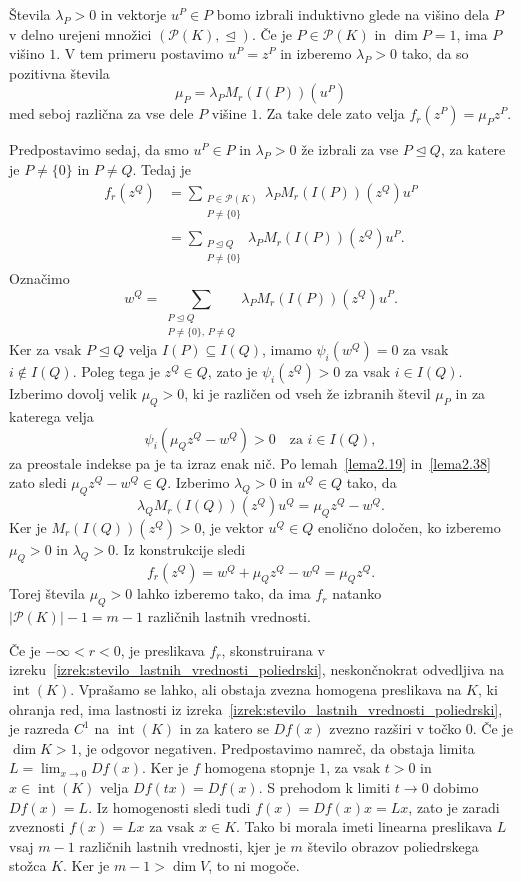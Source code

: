 \documentclass[mat2, tisk]{fmfdelo}
\begin{document}
\begin{dokaz}
Števila $\lambda_P>0$ in vektorje $u^P\in P$ bomo izbrali induktivno
glede na višino dela $P$ v delno urejeni množici
$(\mathcal{P}(K),\trianglelefteq)$. Če je $P\in\mathcal{P}(K)$ in
$\dim P=1$, ima $P$ višino $1$. V tem primeru postavimo $u^P=z^P$ in
izberemo $\lambda_P>0$ tako, da so pozitivna števila
\[
\mu_P=\lambda_P M_r(I(P))(u^P)
\]
med seboj različna za vse dele $P$ višine $1$. Za take dele zato velja
$f_r(z^P)=\mu_P z^P$.

Predpostavimo sedaj, da smo $u^P\in P$ in $\lambda_P>0$ že izbrali za
vse $P\trianglelefteq Q$, za katere je $P\neq\{0\}$ in $P\neq Q$.
Tedaj je
\[
\begin{aligned}
f_r(z^Q)
&=
\sum_{\substack{P\in\mathcal{P}(K)\\P\neq\{0\}}}
\lambda_P M_r(I(P))(z^Q)u^P\\
&=
\sum_{\substack{P\trianglelefteq Q\\P\neq\{0\}}}
\lambda_P M_r(I(P))(z^Q)u^P.
\end{aligned}
\]
Označimo
\[
w^Q
=
\sum_{\substack{P\trianglelefteq Q\\P\neq\{0\},\,P\neq Q}}
\lambda_P M_r(I(P))(z^Q)u^P.
\]
Ker za vsak $P\trianglelefteq Q$ velja
$I(P)\subseteq I(Q)$, imamo
$\psi_i(w^Q)=0$ za vsak $i\notin I(Q)$.
Poleg tega je $z^Q\in Q$, zato je
$\psi_i(z^Q)>0$ za vsak $i\in I(Q)$.
Izberimo dovolj velik $\mu_Q>0$, ki je različen od
vseh že izbranih števil $\mu_P$ in za katerega velja
\[
\psi_i(\mu_Q z^Q-w^Q)>0
\quad\text{za }i\in I(Q),
\]
za preostale indekse pa je ta izraz enak nič.
Po lemah~\ref{lema2.19} in~\ref{lema2.38} zato sledi
$\mu_Q z^Q-w^Q\in Q$. Izberimo $\lambda_Q>0$ in $u^Q\in Q$ tako, da
\[
\lambda_Q M_r(I(Q))(z^Q)u^Q=\mu_Q z^Q-w^Q.
\]
Ker je $M_r(I(Q))(z^Q)>0$, je vektor $u^Q\in Q$ enolično določen, ko
izberemo $\mu_Q>0$ in $\lambda_Q>0$. Iz konstrukcije sledi
\[
f_r(z^Q)=w^Q+\mu_Q z^Q-w^Q=\mu_Q z^Q.
\]
Torej števila $\mu_Q>0$ lahko izberemo tako, da ima $f_r$ natanko
$|\mathcal{P}(K)|-1=m-1$ različnih lastnih vrednosti.
\end{dokaz}

Če je $-\infty<r<0$, je preslikava $f_r$, skonstruirana v
izreku~\ref{izrek:stevilo_lastnih_vrednosti_poliedrski}, neskončnokrat
odvedljiva na $\operatorname{int}(K)$. Vprašamo se lahko, ali obstaja
zvezna homogena preslikava na $K$, ki ohranja red, ima lastnosti iz
izreka~\ref{izrek:stevilo_lastnih_vrednosti_poliedrski}, je razreda
$C^1$ na $\operatorname{int}(K)$ in za katero se $Df(x)$ zvezno razširi
v točko $0$. Če je $\dim K>1$, je odgovor negativen. Predpostavimo
namreč, da obstaja limita $L=\lim_{x\to0}Df(x)$. Ker je $f$ homogena
stopnje $1$, za vsak $t>0$ in $x\in\operatorname{int}(K)$ velja
$Df(tx)=Df(x)$. S prehodom k limiti $t\to0$ dobimo $Df(x)=L$.
Iz homogenosti sledi tudi $f(x)=Df(x)x=Lx$, zato je zaradi zveznosti
$f(x)=Lx$ za vsak $x\in K$. Tako bi morala imeti linearna preslikava
$L$ vsaj $m-1$ različnih lastnih vrednosti, kjer je $m$ število obrazov
poliedrskega stožca $K$. Ker je $m-1>\dim V$, to ni mogoče.
\end{document}
